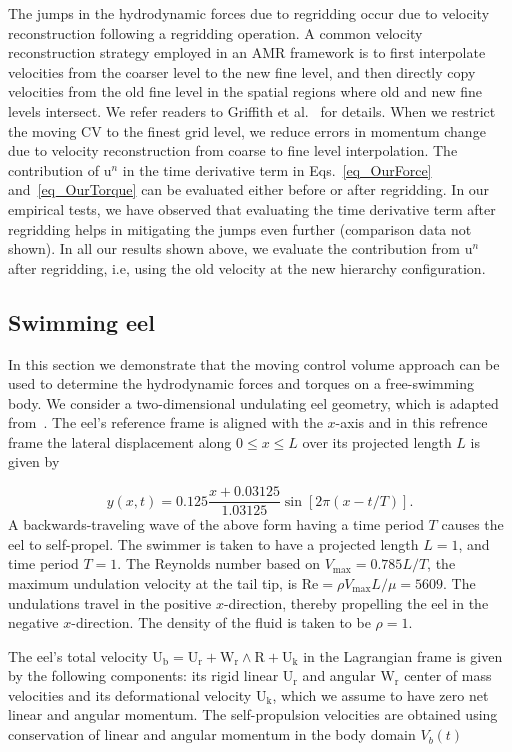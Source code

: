 \documentclass[review]{elsarticle}
\renewcommand{\vec}[1]{\bm{\mathrm{#1}}}
\def \u{\vec{u}}
\def \U{\vec{U}}
\def \Vbt{V_b(t)}
\def \R{\vec{R}}
\def \U{\vec{U}}
\def \Ub{\U_{\text{b}}}
\def \Uk{\U_{\text{k}}}
\def \Ur{\U_{\text{r}}}
\def \W{\vec{W}}
\def \Wr{\W_{\text{r}}}
\def \u{\vec{u}}
\def \Re{\text{Re}}
\begin{document}
The jumps in the hydrodynamic forces due to regridding occur due to 
velocity reconstruction following a regridding operation. A common velocity
reconstruction strategy employed in an AMR framework is to first interpolate velocities 
from the coarser level to the new fine level, and then directly copy velocities from the old fine level 
in the spatial regions where old and new fine levels intersect. We refer readers to
Griffith et al.~\cite{Griffith07} for details.
When we restrict the moving CV to the finest grid level, we reduce errors in 
momentum change due to velocity reconstruction from coarse to fine level interpolation. 
The contribution of $\u^{n}$ in the time derivative term in Eqs.~\eqref{eq_OurForce} 
and~\eqref{eq_OurTorque} can be evaluated either before or after regridding. In our empirical 
tests, we have observed that evaluating the time derivative term after regridding helps in 
mitigating the jumps even further (comparison data not shown). In all our results shown 
above, we evaluate the contribution from $\u^{n}$ after regridding, i.e, using the old velocity 
at the new hierarchy configuration. 

\subsection{Swimming eel}
In this section we demonstrate that the moving control volume approach can be used 
to determine the hydrodynamic forces and torques on a free-swimming body. 
We consider a two-dimensional undulating eel geometry, which is adapted 
from~\cite{Kern06,Bhalla13}. The eel's reference frame is aligned with the $x$-axis 
and in this refrence frame the lateral displacement along $0 \le x \le L$ over its 
projected length $L$ is given by

\begin{equation}
\label{eq_eel_kinematics}
y(x,t) = 0.125 \frac{x+0.03125}{1.03125} \sin \left[2 \pi (x-t/T)\right].
\end{equation}
A backwards-traveling wave of the above form having a time period $T$ 
causes the eel to self-propel. The swimmer is taken to have a projected length 
$L = 1$, and time period $T = 1$. The Reynolds number based on 
$V_\textrm{max} = 0.785 L/T$, the maximum undulation velocity at the tail tip, 
is $\Re = \rho V_\textrm{max} L/\mu = 5609$. The undulations travel in the positive 
$x$-direction, thereby propelling the eel in the negative $x$-direction.
The density of the fluid is taken to be $\rho = 1$.

The eel's total velocity $\Ub = \Ur + \Wr \wedge \R + \Uk$ in the Lagrangian frame 
is given by the following components: its rigid linear $\Ur$ and angular $\Wr$ center of mass velocities
and its deformational velocity $\Uk$, which we assume to have zero net linear and angular momentum. 
The self-propulsion velocities are obtained using conservation of linear and angular momentum in 
the body domain $\Vbt$
\end{document}

